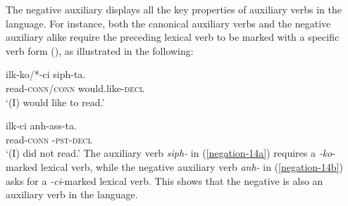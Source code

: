 \documentclass[output=paper
 	        ,biblatex
                ,babelshorthands
                ,newtxmath
                ,draftmode
                ,colorlinks, citecolor=brown
]{langscibook}
\begin{document}
\begin{exe}
\begin{xlist}
\begin{exe}
\begin{xlist}
%


%
The  negative auxiliary displays all the key properties of auxiliary verbs in the language. For instance, both the canonical auxiliary verbs and
the negative auxiliary alike require the preceding lexical verb to be marked with a specific verb form (\vform), as illustrated
in the following:

\eal
\ex\label{negation-14a}
\gll ilk-ko/*-ci siph-ta. \\
     read-\textsc{conn}/\textsc{conn} would.like-\textsc{decl} \\\hfill{}
\glt `(I) would like to read.'

\ex\label{negation-14b}
\gll ilk-ci anh-ass-ta. \\
     read-\textsc{conn} \NEG-\textsc{pst}-\textsc{decl} \\
\glt `(I) did not read.'
\zl
\noindent
The auxiliary verb \textit{siph-} in (\ref{negation-14a}) requires a
\textit{-ko}-marked lexical verb, while the negative auxiliary
 verb \textit{anh-} in (\ref{negation-14b}) asks for a \textit{-ci}-marked lexical
 verb. This shows that the negative is also an auxiliary verb in the language.


\end{xlist}
\end{exe}
\end{xlist}
\end{exe}
\end{document}
